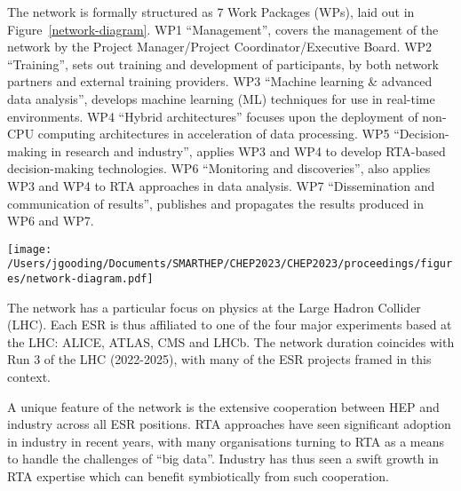 The network is formally structured as 7 Work Packages (WPs), laid out in Figure~\ref{network-diagram}. WP1 ``Management'', covers the management of the network by the Project Manager/Project Coordinator/Executive Board. WP2 ``Training'', sets out training and development of participants, by both network partners and external training providers. WP3 ``Machine learning \& advanced data analysis'', develops machine learning (ML) techniques for use in real-time environments. WP4 ``Hybrid architectures'' focuses upon the deployment of non-CPU computing architectures in acceleration of data processing. WP5 ``Decision-making in research and industry'', applies WP3 and WP4 to develop RTA-based decision-making technologies. WP6 ``Monitoring and discoveries'', also applies WP3 and WP4 to RTA approaches in data analysis. WP7 ``Dissemination and communication of results'', publishes and propagates the results produced in WP6 and WP7.\par
\begin{figure*}[h!]
    \centering
    \texttt{[image: /Users/jgooding/Documents/SMARTHEP/CHEP2023/CHEP2023/proceedings/figures/network-diagram.pdf]}
    \caption{The structure of work packages within the SMARTHEP network. WP1 and WP2 define the organisation of the network; WP3 and WP4 introduce the techniques and tools of real-time analysis to the network; WP5 and WP6 use said techniques and tools to produce results for HEP and industry; WP7 makes these results available and promotes their wider use and adoption.}
    \label{network-diagram}       %
\end{figure*}

The network has a particular focus on physics at the Large Hadron Collider (LHC). Each ESR is thus affiliated to one of the four major experiments based at the LHC: ALICE, ATLAS, CMS and LHCb. The network duration coincides with Run 3 of the LHC (2022-2025), with many of the ESR projects framed in this context. \par

A unique feature of the network is the extensive cooperation between HEP and industry across all ESR positions. RTA approaches have seen significant adoption in industry in recent years, with many organisations turning to RTA as a means to handle the challenges of ``big data''. Industry has thus seen a swift growth in RTA expertise which can benefit symbiotically from such cooperation.